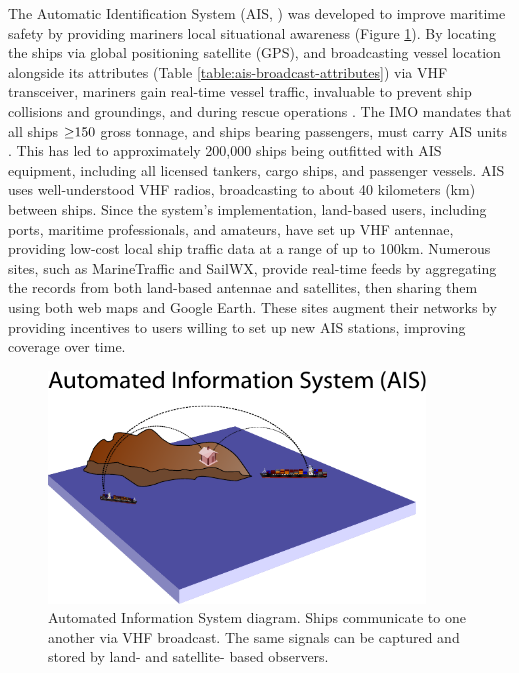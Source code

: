 The Automatic Identification System (AIS, \citealp{no20041028,Tetreault2002}) was developed to improve maritime safety by providing mariners local situational awareness (Figure \ref{fig:ais-overview}). By locating the ships via global positioning satellite (GPS), and broadcasting vessel location alongside its attributes (Table \ref{table:ais-broadcast-attributes}) via VHF transceiver, mariners gain real-time vessel traffic, invaluable to prevent ship collisions and groundings, and during rescue operations \citep{Itu-r2010}.  The IMO mandates that all ships $\geq\negthickspace 150$ gross tonnage, and ships bearing passengers, must carry AIS units \citep{solas}. This has led to approximately 200,000 ships being outfitted with AIS equipment, including all licensed tankers, cargo ships, and passenger vessels. AIS uses well-understood VHF radios, broadcasting to about 40 kilometers (km) between ships. Since the system's implementation, land-based users, including ports, maritime professionals, and amateurs, have set up VHF antennae, providing low-cost local ship traffic data at a range of up to 100km. Numerous sites, such as MarineTraffic \citep{MarineTraffic} and SailWX, provide real-time feeds by aggregating the records from both land-based antennae and satellites, then sharing them using both web maps and Google Earth. These sites augment their networks by providing incentives to users willing to set up new AIS stations, improving coverage over time.

\begin{figure}[htbp]
  \centering
  \includegraphics[width=100mm]{figures/towers/drawing-myriad.pdf}
  \caption[Automated Information System diagram]{Automated Information System diagram. Ships communicate to one another via VHF broadcast. The same signals can be captured and stored by land- and satellite- based observers.}
  \label{fig:ais-overview}
\end{figure}

